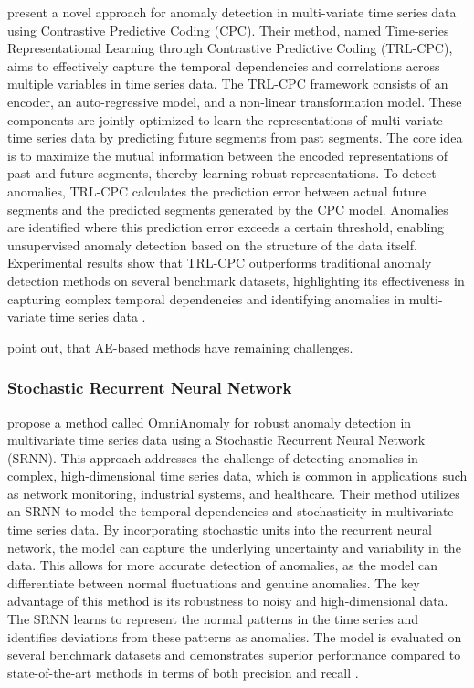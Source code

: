 %
 present a novel approach for anomaly detection in multi-variate time series data using Contrastive Predictive Coding (CPC). Their method, named Time-series Representational Learning through Contrastive Predictive Coding (TRL-CPC), aims to effectively capture the temporal dependencies and correlations across multiple variables in time series data.
The TRL-CPC framework consists of an encoder, an auto-regressive model, and a non-linear transformation model. These components are jointly optimized to learn the representations of multi-variate time series data by predicting future segments from past segments. The core idea is to maximize the mutual information between the encoded representations of past and future segments, thereby learning robust representations.
To detect anomalies, TRL-CPC calculates the prediction error between actual future segments and the predicted segments generated by the CPC model. Anomalies are identified where this prediction error exceeds a certain threshold, enabling unsupervised anomaly detection based on the structure of the data itself.
Experimental results show that TRL-CPC outperforms traditional anomaly detection methods on several benchmark datasets, highlighting its effectiveness in capturing complex temporal dependencies and identifying anomalies in multi-variate time series data \cite{pranavan_contrastive_2022}.

 point out, that AE-based methods have remaining challenges.
\subsubsection{Stochastic Recurrent Neural Network}
 propose a method called OmniAnomaly for robust anomaly detection in multivariate time series data using a Stochastic Recurrent Neural Network (SRNN). This approach addresses the challenge of detecting anomalies in complex, high-dimensional time series data, which is common in applications such as network monitoring, industrial systems, and healthcare.
Their method utilizes an SRNN to model the temporal dependencies and stochasticity in multivariate time series data. By incorporating stochastic units into the recurrent neural network, the model can capture the underlying uncertainty and variability in the data. This allows for more accurate detection of anomalies, as the model can differentiate between normal fluctuations and genuine anomalies.
The key advantage of this method is its robustness to noisy and high-dimensional data. The SRNN learns to represent the normal patterns in the time series and identifies deviations from these patterns as anomalies. The model is evaluated on several benchmark datasets and demonstrates superior performance compared to state-of-the-art methods in terms of both precision and recall \cite{su_robust_2019}.

